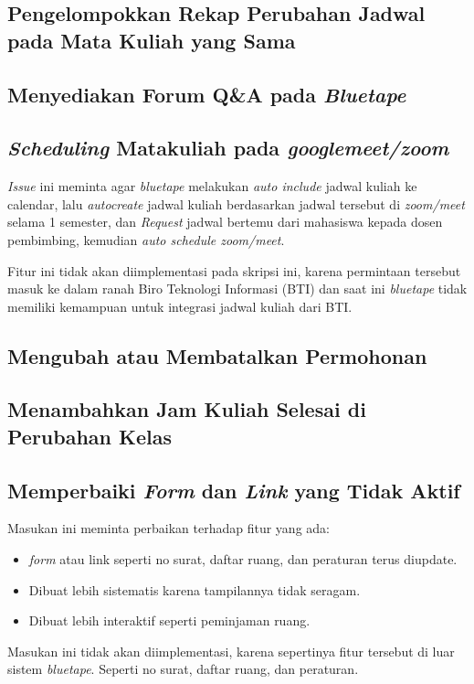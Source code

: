\subsection{Pengelompokkan Rekap Perubahan Jadwal pada Mata Kuliah yang Sama}
\subsection{Menyediakan Forum Q\&A pada \textit{Bluetape}}
\subsection{\textit{Scheduling} Matakuliah pada \textit{googlemeet/zoom}}
\textit{Issue} ini meminta agar \textit{bluetape} melakukan \textit{auto include} jadwal kuliah ke calendar, lalu \textit{autocreate} jadwal kuliah berdasarkan jadwal tersebut di \textit{zoom/meet} selama 1 semester, dan \textit{Request} jadwal bertemu dari mahasiswa kepada dosen pembimbing, kemudian \textit{auto schedule zoom/meet}.

Fitur ini tidak akan diimplementasi pada skripsi ini, karena permintaan tersebut masuk ke dalam ranah Biro Teknologi Informasi (BTI) dan saat ini \textit{bluetape} tidak memiliki kemampuan untuk integrasi jadwal kuliah dari BTI.

\subsection{Mengubah atau Membatalkan Permohonan}
\subsection{Menambahkan Jam Kuliah Selesai di Perubahan Kelas}

\subsection{Memperbaiki \textit{Form} dan \textit{Link} yang Tidak Aktif}
Masukan ini meminta perbaikan terhadap fitur yang ada: 
\begin{itemize}
	\item \textit{form} atau link seperti no surat, daftar ruang, dan peraturan terus diupdate.
	\item Dibuat lebih sistematis karena tampilannya tidak seragam.
	\item Dibuat lebih interaktif seperti peminjaman ruang.
\end{itemize}   

Masukan ini tidak akan diimplementasi, karena sepertinya fitur tersebut di luar sistem \textit{bluetape}. Seperti no surat, daftar ruang, dan peraturan.


